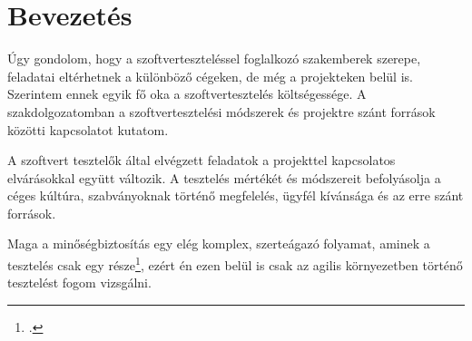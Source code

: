 \section{Bevezetés}
Úgy gondolom, hogy a szoftverteszteléssel foglalkozó szakemberek szerepe, feladatai eltérhetnek a különböző cégeken, de még a projekteken belül is.
Szerintem ennek egyik fő oka a szoftvertesztelés költségessége. A szakdolgozatomban a szoftvertesztelési módszerek és projektre szánt források közötti kapcsolatot kutatom.

A szoftvert tesztelők által elvégzett feladatok a projekttel kapcsolatos elvárásokkal együtt változik.
A tesztelés mértékét és módszereit befolyásolja a céges kúltúra, szabványoknak történő megfelelés, ügyfél kívánsága és az erre szánt források.

Maga a minőségbiztosítás egy elég komplex, szerteágazó folyamat, aminek a tesztelés csak egy része\footcite{softwarequalityassurance2016}, ezért én ezen belül is csak az agilis környezetben történő tesztelést fogom vizsgálni.